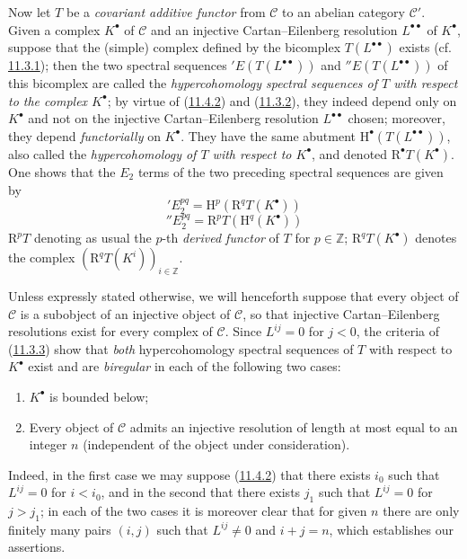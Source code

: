 \begin{env}[11.4.3]
\label{0.11.4.3}
Now let $T$ be a \emph{covariant additive functor} from $\mathcal C$
to an abelian category $\mathcal C'$. Given a complex
$K^\bullet$ of $\mathcal C$ and an injective Cartan--Eilenberg resolution
$L^{\bullet\bullet}$ of $K^\bullet$, suppose that the (simple) complex defined
by the bicomplex $T(L^{\bullet\bullet})$ exists
(cf. \hyperref[0.11.3.1]{11.3.1}); then the two spectral sequences
$'E(T(L^{\bullet\bullet}))$ and $''E(T(L^{\bullet\bullet}))$ of this bicomplex
are called the \emph{hypercohomology spectral sequences of $T$ with respect to the
complex $K^\bullet$}; by virtue of
(\hyperref[0.11.4.2]{11.4.2}) and
(\hyperref[0.11.3.2]{11.3.2}), they indeed depend only on
$K^\bullet$ and not on the injective Cartan--Eilenberg resolution
$L^{\bullet\bullet}$ chosen; moreover, they depend
\emph{functorially} on $K^\bullet$. They have the same abutment
$\mathrm H^\bullet(T(L^{\bullet\bullet}))$, also called
the \emph{hypercohomology of $T$ with respect to $K^\bullet$}, and denoted
$\mathrm R^\bullet T(K^\bullet)$. One shows that the $E_2$ terms of the two
preceding spectral sequences are given by
\[
  \label{0.11.4.3.1}
  'E_2^{pq}=\mathrm H^p(\mathrm R^qT(K^\bullet))
  \tag{11.4.3.1}
\]
\[
  \label{0.11.4.3.2}
  ''E_2^{pq}=\mathrm R^pT(\mathrm H^q(K^\bullet))
  \tag{11.4.3.2}
\]
$\mathrm R^pT$ denoting as usual the $p$-th \emph{derived
functor} of $T$ for $p\in\mathbb Z$; $\mathrm R^qT(K^\bullet)$ denotes the
complex $(\mathrm R^qT(K^i))_{i\in\mathbb Z}$.

Unless expressly stated otherwise, we will henceforth suppose that every object
of $\mathcal C$ is a subobject of an injective object of $\mathcal C$, so
that injective Cartan--Eilenberg resolutions exist for every complex
of $\mathcal C$. Since $L^{ij}=0$ for $j<0$, the criteria of
(\hyperref[0.11.3.3]{11.3.3}) show that \emph{both} hypercohomology
spectral sequences of $T$ with respect to $K^\bullet$ exist and
are \emph{biregular} in each of the following two cases:
\begin{enumerate}
  \item[$1^\circ$] $K^\bullet$ is bounded below;
  \item[$2^\circ$] Every object of $\mathcal C$ admits an injective resolution
    of length at most equal to an integer $n$ (independent of the object
    under consideration).
\end{enumerate}
Indeed, in the first case we may suppose
(\hyperref[0.11.4.2]{11.4.2}) that there exists $i_0$ such that $L^{ij}=0$ for
$i<i_0$, and in the second that there exists $j_1$ such that $L^{ij}=0$ for $j>j_1$;
in each of the two cases it is moreover clear that for given $n$ there are
only finitely many pairs $(i,j)$ such that $L^{ij}\neq0$ and $i+j=n$, which
establishes our assertions.


\end{env}
